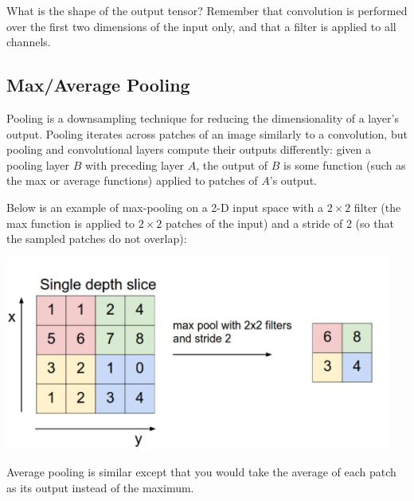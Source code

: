 \problem[3] What is the shape of the output tensor? Remember that convolution is performed over the first two dimensions of the input only, and that a filter is applied to all channels.

\begin{subsolution}

\end{subsolution}

 \subsection{Max/Average Pooling}

Pooling is a downsampling technique for reducing the dimensionality of a layer's output. Pooling iterates across patches of an image similarly to a convolution, but pooling and convolutional layers compute their outputs differently: given a pooling layer $B$ with preceding layer $A$, the output of $B$ is some function (such as the max or average functions) applied to patches of $A$'s output.

Below is an example of max-pooling on a 2-D input space with a $2\times 2$ filter (the max function is applied to $2\times 2$ patches of the input) and a stride of 2 (so that the sampled patches do not overlap):

\begin{center}
  \includegraphics[width=.49\textwidth]{Plots/MaxPool.png}
\end{center}

Average pooling is similar except that you would take the average of each patch as its output instead of the maximum.

